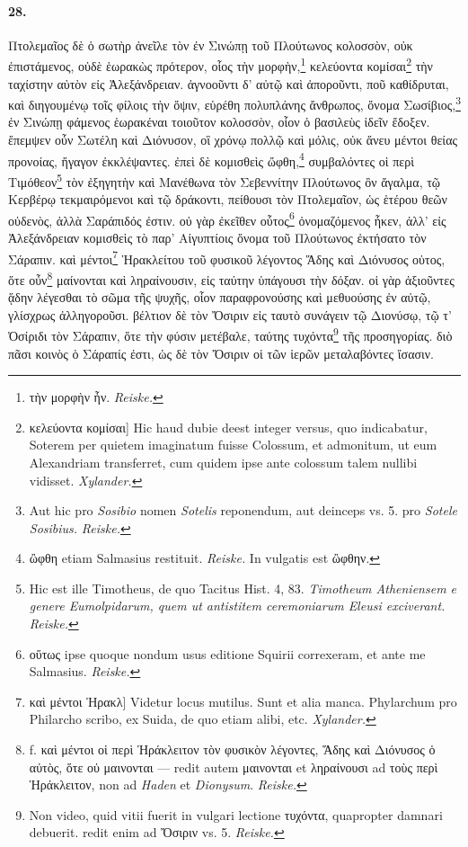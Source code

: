\documentclass[a4paper, 11pt, oneside, polutonikogreek, german]{article}
\begin{document}
\paragraph{28.}
Πτολεμαῖος δὲ ὁ σωτὴρ ἀνεῖλε τὸν ἐν Σινώπῃ τοῦ Πλούτωνος κολοσσὸν, οὐκ ἐπιστάμενος, οὐδὲ ἑωρακὼς πρότερον, οἷος τὴν μορφὴν,\footnote{τὴν μορφὴν ἦν. \emph{Reiske.}} κελεύοντα κομίσαι\footnote{κελεύοντα κομίσαι] Hic haud dubie deest integer versus, quo indicabatur, Soterem per quietem imaginatum fuisse Colossum, et admonitum, ut eum Alexandriam transferret, cum quidem ipse ante colossum talem nullibi vidisset. \emph{Xylander.}} τὴν ταχίστην αὐτὸν εἰς Ἀλεξάνδρειαν. ἀγνοοῦντι δ' αὐτῷ καὶ ἀποροῦντι, ποῦ καθίδρυται, καὶ διηγουμένῳ τοῖς φίλοις τὴν ὄψιν, εὑρέθη πολυπλάνης ἄνθρωπος, ὄνομα Σωσίβιος,\footnote{Aut hic pro \emph{Sosibio} nomen \emph{Sotelis} reponendum, aut deinceps vs. 5. pro \emph{Sotele Sosibius.} \emph{Reiske.}} ἐν Σινώπῃ φάμενος ἑωρακέναι τοιοῦτον κολοσσὸν, οἷον ὁ βασιλεὺς ἰδεῖν ἔδοξεν. ἔπεμψεν οὖν Σωτέλη καὶ Διόνυσον, οἳ χρόνῳ πολλῷ καὶ μόλις, οὐκ ἄνευ μέντοι θείας προνοίας, ἤγαγον ἐκκλέψαντες. ἐπεὶ δὲ κομισθεὶς ὤφθη,\footnote{ὢφθη etiam Salmasius restituit. \emph{Reiske.} In vulgatis est ὢφθην.} συμβαλόντες οἱ περὶ Τιμόθεον\footnote{Hic est ille Timotheus, de quo Tacitus Hist. 4, 83. \emph{Timotheum Atheniensem e genere Eumolpidarum, quem ut antistitem ceremoniarum Eleusi exciverant.} \emph{Reiske.}} τὸν ἐξηγητὴν καὶ Μανέθωνα τὸν Σεβεννίτην Πλούτωνος ὂν ἄγαλμα, τῷ Κερβέρῳ τεκμαιρόμενοι καὶ τῷ δράκοντι, πείθουσι τὸν Πτολεμαῖον, ὡς ἑτέρου θεῶν οὐδενὸς, ἀλλὰ Σαράπιδός ἐστιν. οὐ γὰρ ἐκεῖθεν οὗτος\footnote{οὕτως ipse quoque nondum usus editione Squirii correxeram, et ante me Salmasius. \emph{Reiske.}} ὀνομαζόμενος ἧκεν, ἀλλ' εἰς Ἀλεξάνδρειαν κομισθεὶς τὸ παρ' Αἰγυπτίοις ὄνομα τοῦ Πλούτωνος ἐκτήσατο τὸν Σάραπιν. καὶ μέντοι\footnote{καὶ μέντοι Ἡρακλ] Videtur locus mutilus. Sunt et alia manca. Phylarchum pro Philarcho scribo, ex Suida, de quo etiam alibi, etc. \emph{Xylander.}} Ἡρακλείτου τοῦ φυσικοῦ λέγοντος Ἅδης καὶ Διόνυσος οὑτος, ὅτε οὖν\footnote{f. καὶ μέντοι οἱ περὶ Ἡράκλειτον τὸν φυσικὸν λέγοντες, Ἅδης καὶ Διόνυσος ὁ αὐτὸς, ὅτε οὐ μαινονται --- redit autem μαινονται et ληραίνουσι ad τοὺς περὶ Ἡράκλειτον, non ad \emph{Haden} et \emph{Dionysum}. \emph{Reiske.}} μαίνονται καὶ ληραίνουσιν, εἰς ταύτην ὑπάγουσι τὴν δόξαν. οἱ γὰρ ἀξιοῦντες ᾅδην λέγεσθαι τὸ σῶμα τῆς ψυχῆς, οἷον παραφρονούσης καὶ μεθυούσης ἐν αὐτῷ, γλίσχρως ἀλληγοροῦσι. βέλτιον δὲ τὸν Ὄσιριν εἰς ταυτὸ συνάγειν τῷ Διονύσῳ, τῷ τ' Ὀσίριδι τὸν Σάραπιν, ὅτε τὴν φύσιν μετέβαλε, ταύτης τυχόντα\footnote{Non video, quid vitii fuerit in vulgari lectione τυχόντα, quapropter damnari debuerit. redit enim ad Ὄσιριν vs. 5. \emph{Reiske.}} τῆς προσηγορίας. διὸ πᾶσι κοινὸς ὁ Σάραπίς ἐστι, ὡς δὲ τὸν Ὄσιριν οἱ τῶν ἱερῶν μεταλαβόντες ἴσασιν.
\end{document}
